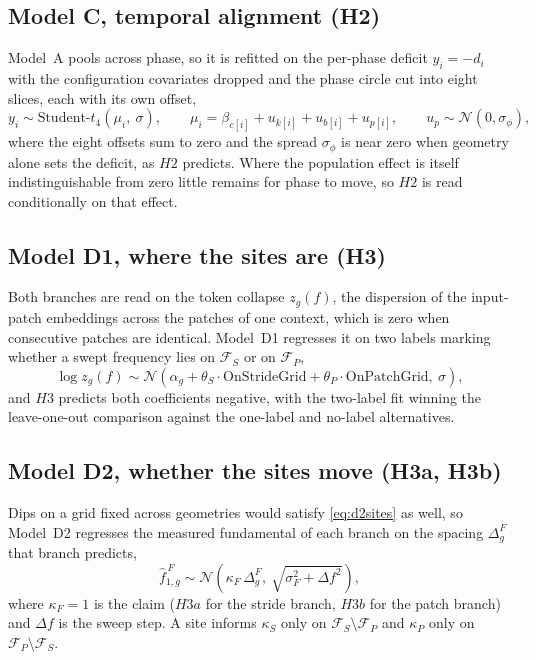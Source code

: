 \subsection*{Model C, temporal alignment (H2)}
Model~A pools across phase, so it is refitted on the per-phase deficit $y_i=-d_i$ with the configuration covariates dropped and the phase circle cut into eight slices, each with its own offset,
\begin{equation}
\label{eq:d2phase}
y_i \sim \text{Student-}t_4(\mu_i,\ \sigma),
\qquad
\mu_i = \beta_{c[i]} + u_{k[i]} + u_{b[i]} + u_{p[i]},
\qquad
u_p \sim \mathcal{N}(0, \sigma_\phi),
\end{equation}
where the eight offsets sum to zero and the spread $\sigma_\phi$ is near zero when geometry alone sets the deficit, as $H2$ predicts. Where the population effect is itself indistinguishable from zero little remains for phase to move, so $H2$ is read conditionally on that effect.

\subsection*{Model D1, where the sites are (H3)}
Both branches are read on the token collapse $z_g(f)$, the dispersion of the input-patch embeddings across the patches of one context, which is zero when consecutive patches are identical. Model~D1 regresses it on two labels marking whether a swept frequency lies on $\mathcal F_S$ or on $\mathcal F_P$,
\begin{equation}
\label{eq:d2sites}
\log z_g(f) \sim \mathcal{N}\!\left(
\alpha_g + \theta_S \cdot \text{OnStrideGrid} + \theta_P \cdot \text{OnPatchGrid},\ \sigma
\right),
\end{equation}
and $H3$ predicts both coefficients negative, with the two-label fit winning the leave-one-out comparison against the one-label and no-label alternatives.

\subsection*{Model D2, whether the sites move (H3a, H3b)}
Dips on a grid fixed across geometries would satisfy \autoref{eq:d2sites} as well, so Model~D2 regresses the measured fundamental of each branch on the spacing $\Delta^F_g$ that branch predicts,
\begin{equation}
\label{eq:d2spacing}
\hat f^{\,F}_{1,g} \sim \mathcal{N}\!\left(
\kappa_F \,\Delta^F_g,\ \sqrt{\sigma_F^2+\Delta f^2}
\right),
\end{equation}
where $\kappa_F=1$ is the claim ($H3a$ for the stride branch, $H3b$ for the patch branch) and $\Delta f$ is the sweep step. A site informs $\kappa_S$ only on $\mathcal F_S \setminus \mathcal F_P$ and $\kappa_P$ only on $\mathcal F_P \setminus \mathcal F_S$.

